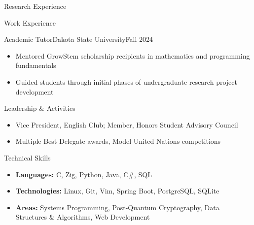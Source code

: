 \documentclass[]{mcdowellcv}
\begin{document}
\begin{cvsection}{Research Experience}
\end{cvsection}

\begin{cvsection}{Work Experience}
  \begin{cvsubsection}{Academic Tutor}{Dakota State University}{Fall 2024}
    \begin{itemize}
      \item Mentored GrowStem scholarship recipients in mathematics and programming fundamentals
      \item Guided students through initial phases of undergraduate research project development
    \end{itemize}
  \end{cvsubsection}
\end{cvsection}

\begin{cvsection}{Leadership \& Activities}
  \begin{cvsubsection}{}{}{}
    \begin{itemize}
      \item Vice President, English Club; Member, Honors Student Advisory Council
      \item Multiple Best Delegate awards, Model United Nations competitions
    \end{itemize}
  \end{cvsubsection}
\end{cvsection}

\begin{cvsection}{Technical Skills}
  \begin{cvsubsection}{}{}{}
    \begin{itemize}
      \item \textbf{Languages:} C, Zig, Python, Java, C\#, SQL
      \item \textbf{Technologies:} Linux, Git, Vim, Spring Boot, PostgreSQL, SQLite
      \item \textbf{Areas:} Systems Programming, Post-Quantum Cryptography, Data Structures \& Algorithms, Web Development
    \end{itemize}
  \end{cvsubsection}
\end{cvsection}
\end{document}
